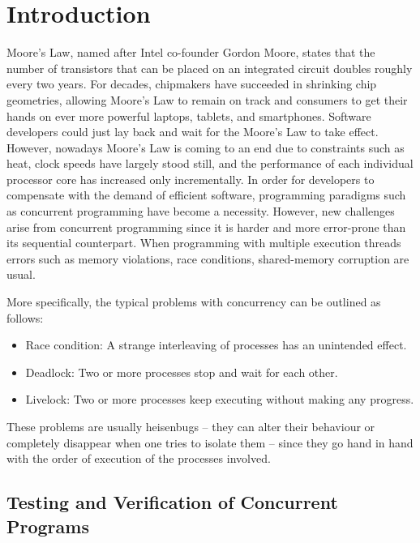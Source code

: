 \chapter{Introduction}

Moore's Law, named after Intel co-founder Gordon Moore, states that the number of transistors that can be placed on an integrated circuit doubles
roughly every two years. For decades, chipmakers have succeeded in shrinking chip geometries, allowing Moore's Law to remain on track and consumers to 
get their hands on ever more powerful laptops, tablets, and smartphones. Software developers could just lay back and wait for the Moore's Law to take effect.
However, nowadays Moore's Law is coming to an end due to constraints such as heat, clock speeds have largely stood still, and the performance of each individual 
processor core has increased only incrementally. In order for developers to compensate with the demand of efficient software, programming paradigms such
as concurrent programming have become a necessity. However, new challenges arise from concurrent programming since it is harder and more
error-prone than its sequential counterpart. When programming with multiple execution threads errors such as  memory violations, race conditions, shared-memory corruption
are usual.

More specifically, the typical problems with concurrency can be outlined as follows:
\begin{itemize}
\item Race condition: A strange interleaving of processes has an unintended effect.
\item Deadlock: Two or more processes stop and wait for each other.
\item Livelock: Two or more processes keep executing without making any progress.
\end{itemize}

These problems are usually heisenbugs \cite{Musu08} – they can alter their behaviour or completely
disappear when one tries to isolate them – since they go hand in hand with the order of
execution of the processes involved.

\section{Testing and Verification of Concurrent Programs}

